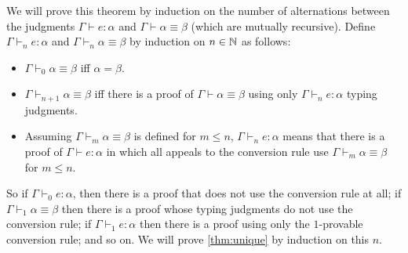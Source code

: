 We will prove this theorem by induction on the number of alternations between the judgments $\Gamma\vdash e:\alpha$ and $\Gamma\vdash\alpha\equiv\beta$ (which are mutually recursive). Define $\Gamma\vdash_n e:\alpha$ and $\Gamma\vdash_n\alpha\equiv\beta$ by induction on $n\in\mathbb{N}$ as follows:
\begin{itemize}
\item $\Gamma\vdash_0\alpha\equiv\beta$ iff $\alpha=\beta$.
\item $\Gamma\vdash_{n+1}\alpha\equiv\beta$ iff there is a proof of $\Gamma\vdash\alpha\equiv\beta$ using  only $\Gamma\vdash_n e:\alpha$ typing judgments.
\item Assuming $\Gamma\vdash_m\alpha\equiv\beta$ is defined for $m\le n$, $\Gamma\vdash_n e:\alpha$ means that there is a proof of $\Gamma\vdash e:\alpha$ in which all appeals to the conversion rule use $\Gamma\vdash_m\alpha\equiv\beta$ for $m\le n$.
\end{itemize}
So if $\Gamma\vdash_0 e:\alpha$, then there is a proof that does not use the conversion rule at all; if $\Gamma\vdash_1\alpha\equiv\beta$ then there is a proof whose typing judgments do not use the conversion rule; if $\Gamma\vdash_1 e:\alpha$ then there is a proof using only the $1$-provable conversion rule; and so on. We will prove \autoref{thm:unique} by induction on this $n$.

